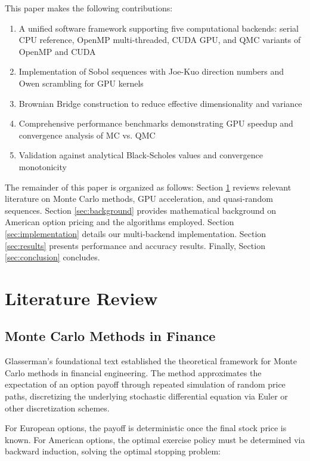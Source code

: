 \documentclass[11pt,a4paper]{article}
\begin{document}
This paper makes the following contributions:

\begin{enumerate}
    \item A unified software framework supporting five computational backends: serial CPU reference, OpenMP multi-threaded, CUDA GPU, and QMC variants of OpenMP and CUDA
    \item Implementation of Sobol sequences with Joe-Kuo direction numbers and Owen scrambling for GPU kernels
    \item Brownian Bridge construction to reduce effective dimensionality and variance
    \item Comprehensive performance benchmarks demonstrating GPU speedup and convergence analysis of MC vs. QMC
    \item Validation against analytical Black-Scholes values and convergence monotonicity
\end{enumerate}

The remainder of this paper is organized as follows: Section \ref{sec:lit} reviews relevant literature on Monte Carlo methods, GPU acceleration, and quasi-random sequences. Section \ref{sec:background} provides mathematical background on American option pricing and the algorithms employed. Section \ref{sec:implementation} details our multi-backend implementation. Section \ref{sec:results} presents performance and accuracy results. Finally, Section \ref{sec:conclusion} concludes.

\section{Literature Review}\label{sec:lit}

\subsection{Monte Carlo Methods in Finance}

Glasserman's foundational text \cite{glasserman2004monte} established the theoretical framework for Monte Carlo methods in financial engineering. The method approximates the expectation of an option payoff through repeated simulation of random price paths, discretizing the underlying stochastic differential equation via Euler or other discretization schemes.

For European options, the payoff is deterministic once the final stock price is known. For American options, the optimal exercise policy must be determined via backward induction, solving the optimal stopping problem:
\end{document}
